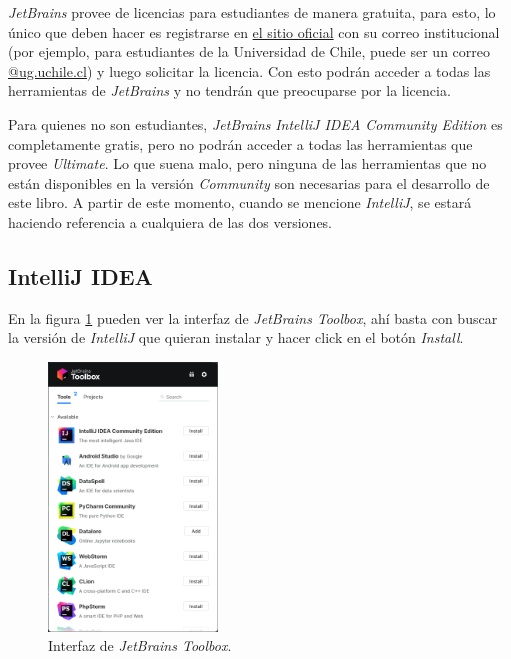     \begin{note}
      \textit{JetBrains} provee de licencias para estudiantes de manera gratuita, para esto, lo único
      que deben hacer es registrarse en  
      \href{https://www.jetbrains.com/es-es/community/education/#students}{el sitio oficial} con su
      correo institucional (por ejemplo, para estudiantes de la Universidad de Chile, puede ser un
      correo \url{@ug.uchile.cl}) y luego solicitar la licencia.
      Con esto podrán acceder a todas las herramientas de \textit{JetBrains} y no tendrán que 
      preocuparse por la licencia.

      Para quienes no son estudiantes, \textit{JetBrains} \textit{IntelliJ IDEA Community Edition} es
      completamente gratis, pero no podrán acceder a todas las herramientas que provee 
      \textit{Ultimate}.
      Lo que suena malo, pero ninguna de las herramientas que no están disponibles en la versión 
      \textit{Community} son necesarias para el desarrollo de este libro. 
      A partir de este momento, cuando se mencione \textit{IntelliJ}, se estará haciendo referencia a
      cualquiera de las dos versiones.
    \end{note}

  \subsection{IntelliJ IDEA}
    
    En la figura \ref{fig:jb-toolbox} pueden ver la interfaz de \textit{JetBrains Toolbox}, ahí 
    basta con buscar la versión de \textit{IntelliJ} que quieran instalar y hacer click en el botón
    \textit{Install}.

    \begin{figure}[H]
      \centering
      \includegraphics[width=0.4\textwidth]{img/Por_algo_se_empieza/jetbrains-toolbox.png}
      \caption{Interfaz de \textit{JetBrains Toolbox}.}
      \label{fig:jb-toolbox}
    \end{figure}
